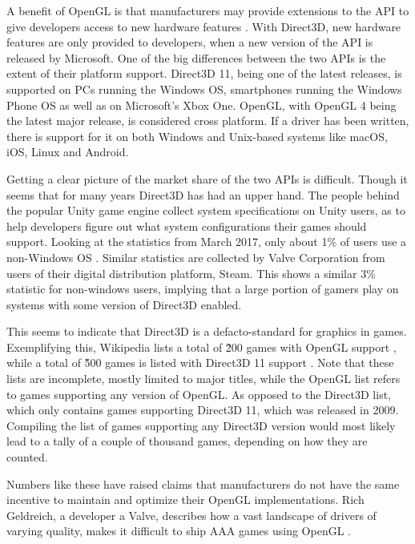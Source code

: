 A benefit of OpenGL is that manufacturers may provide extensions to the \gls{API} to give developers access to new hardware features \cite{openGLExtensions}.
With Direct3D, new hardware features are only provided to developers, when a new version of the \gls{API} is released by Microsoft. 
One of the big differences between the two \glspl{API} is the extent of their platform support.
Direct3D 11, being one of the latest releases, is supported on PCs running the Windows \gls{OS}, smartphones running the Windows Phone \gls{OS} as well as on Microsoft’s Xbox One.
OpenGL, with OpenGL 4 being the latest major release, is considered cross platform.
If a driver has been written, there is support for it on both Windows and Unix-based systems like macOS, iOS, Linux and Android. 

Getting a clear picture of the market share of the two \glspl{API} is difficult.
Though it seems that for many years Direct3D has had an upper hand.
The people behind the popular Unity game engine collect system specifications on Unity users, as to help developers figure out what system configurations their games should support.
Looking at the statistics from March 2017, only about 1\% of users use a non-Windows \gls{OS} \cite{unityStats}.
Similar statistics are collected by Valve Corporation from users of their digital distribution platform, Steam.
This shows a similar 3\% statistic for non-windows users\cite{steamStats}, implying that a large portion of gamers play on systems with some version of Direct3D enabled.

This seems to indicate that Direct3D is a defacto-standard for graphics in games. 
Exemplifying this, Wikipedia lists a total of \~200 games with OpenGL support \cite{wikiOpenGLGames}, while a total of \~500 games is listed with Direct3D 11 support \cite{
DX11Games}. 
Note that these lists are incomplete, mostly limited to major titles, while the OpenGL list refers to games supporting any version of OpenGL.
As opposed to the Direct3D list, which only contains games supporting Direct3D 11, which was released in 2009.
Compiling the list of games supporting any Direct3D version would most likely lead to a tally of a couple of thousand games, depending on how they are counted.
   
Numbers like these have raised claims that manufacturers do not have the same incentive to maintain and optimize their OpenGL implementations.
Rich Geldreich, a developer a Valve, describes how a vast landscape of drivers of varying quality, makes it difficult to ship AAA games using OpenGL \cite{openGLDriverQuality}.
 
